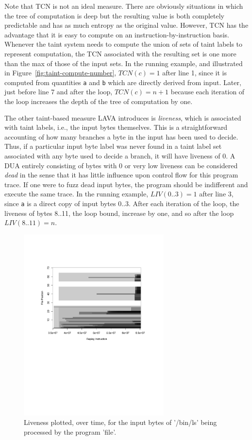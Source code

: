 Note that TCN is not an ideal measure.
There are obviously situations in which the tree of computation is deep but the resulting value is both completely predictable and has as much entropy as the original value.
However, TCN has the advantage that it is easy to compute on an instruction-by-instruction basis.
Whenever the taint system needs to compute the union of sets of taint labels to represent computation, the TCN associated with the resulting set is one more than the max of those of the input sets.
In the running example, and illustrated in Figure~\ref{fig:taint-compute-number}, $TCN(c)=1$ after line 1, since it is computed from quantities \verb+a+ and \verb+b+ which are directly derived from input.
Later, just before line 7 and after the loop, $TCN(c)=n+1$ because each iteration of the loop increases the depth of the tree of computation by one.  

The other taint-based measure LAVA introduces is \emph{liveness}, which is associated with taint labels, i.e., the input bytes themselves.
This is a straightforward accounting of how many branches a byte in the input has been used to decide.
Thus, if a particular input byte label was never found in a taint label set associated with any byte used to decide a branch, it will have liveness of 0.
A DUA entirely consisting of bytes with 0 or very low liveness can be considered \emph{dead} in the sense that it has little influence upon control flow for this program trace.
If one were to fuzz dead input bytes, the program should be indifferent and execute the same trace.  
In the running example, $LIV(0..3)=1$ after line 3, since \verb+a+ is a direct copy of input bytes 0..3.
After each iteration of the loop, the liveness of bytes 8..11, the loop bound, increase by one, and so after the loop $LIV(8..11)=n$.


\begin{figure}
\centering
\includegraphics[width=3in]{liv-graph.png}
\caption{Liveness plotted, over time, for the input bytes of '/bin/ls' being processed by the program 'file'.}
\label{fig:liv-graph}
\end{figure}

